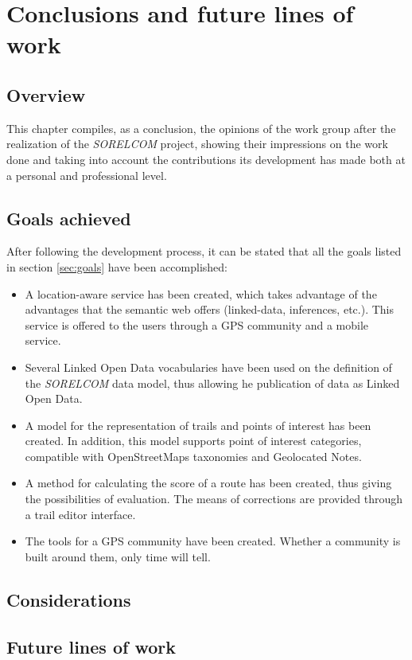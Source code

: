 \chapter{Conclusions and future lines of work}\label{ch:conclusions}

\section{Overview}

This chapter compiles, as a conclusion, the opinions of the work group after the realization of the \textit{SORELCOM} project, showing their impressions on the work done and taking into account the contributions its development has made both at a personal and professional level.

\section{Goals achieved}

After following the development process, it can be stated that all the goals listed in section \ref{sec:goals} have been accomplished:

\begin{itemize}
\item A location-aware service has been created, which takes advantage of the advantages that the semantic web offers (linked-data, inferences, etc.). This service is offered to the users through a GPS community and a mobile service.

\item Several Linked Open Data vocabularies have been used on the definition of the \textit{SORELCOM} data model, thus allowing he publication of data as Linked Open Data. 

\item A model for the representation of trails and points of interest has been created. In addition, this model supports point of interest categories, compatible with OpenStreetMaps taxonomies and Geolocated Notes.

\item A method for calculating the score of a route has been created, thus giving the possibilities of evaluation. The means of corrections are provided through a trail editor interface.

\item The tools for a GPS community have been created. Whether a community is built around them, only time will tell.

\end{itemize}

\section{Considerations}

\section{Future lines of work}